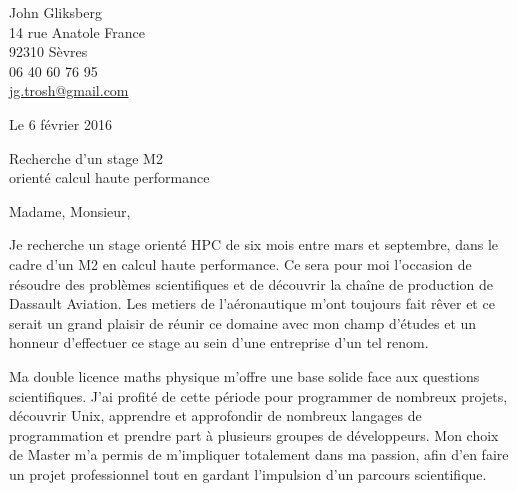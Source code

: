 \documentclass[12pt,a4paper]{article}
\begin{document}
\begin{minipage}{.5\textwidth}
\begin{flushleft}
John Gliksberg \\
14 rue Anatole France \\
92310 Sèvres \\
06 40 60 76 95 \\
\href{mailto:jg.trosh@gmail.com}
{jg.trosh@gmail.com}
\end{flushleft}
\end{minipage}

{
    \hspace*{\fill}
    \begin{minipage}{.5\textwidth}
    \begin{flushleft}
    Le 6 février 2016
    \end{flushleft}
    \end{minipage}
}

\vspace*{\fill}

\begin{center}
    \large
    Recherche d'un stage M2 \\
    orienté calcul haute performance
\end{center}

\vspace*{\fill}

Madame, Monsieur,

Je recherche un stage orienté HPC de six mois entre mars et septembre,
dans le cadre d'un M2 en calcul haute performance.
Ce sera pour moi l'occasion de résoudre des problèmes scientifiques
et de découvrir la chaîne de production de Dassault Aviation.
Les metiers de l’aéronautique m’ont toujours fait rêver et
ce serait un grand plaisir de réunir ce domaine avec mon
champ d’études et un honneur d’effectuer ce stage au sein
d’une entreprise d’un tel renom.

Ma double licence maths physique m'offre
une base solide face aux questions scientifiques.
J'ai profité de cette période pour programmer de nombreux projets,
découvrir Unix, apprendre et approfondir de nombreux langages de programmation
et prendre part à plusieurs groupes de développeurs.
Mon choix de Master m'a permis de m'impliquer totalement dans ma passion,
afin d'en faire un projet professionnel tout en gardant
l'impulsion d'un parcours scientifique.
\end{document}
